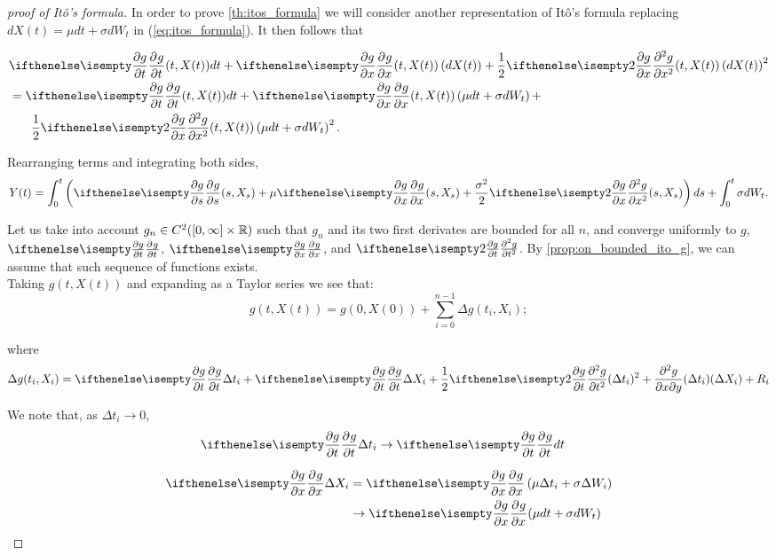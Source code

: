 \documentclass[../TGMAFFIRO.tex]{subfiles}
\begin{document}
\begin{proof}[proof of It\^o's formula]
	In order to prove \ref{th:itos_formula} we will consider another representation of It\^o's formula replacing $dX(t) = \mu dt + \sigma dW_t$ in (\ref{eq:itos_formula}). It then follows that
	
	\begin{align*}
		&\partialwrt{g}{t}(t, X(t)) dt + \partialwrt{g}{x}(t, X(t)) \left(dX(t)\right) + \frac{1}{2}\partialwrt[2]{g}{x} (t, X(t)) \left(dX(t)\right)^2 \\
		&= \partialwrt{g}{t}(t, X(t)) dt + \partialwrt{g}{x}(t, X(t)) \left(\mu dt + \sigma dW_t\right) + \\
		&\phantom{{}=1} \frac{1}{2}\partialwrt[2]{g}{x} (t, X(t)) \left(\mu dt + \sigma dW_t\right)^2.
	\end{align*}
	
	Rearranging terms and integrating both sides, 
	\begin{equation}
  Y(t) = \int_0^t \left(\partialwrt{g}{s}{(s, X_s)} + \mu\partialwrt{g}{x}{(s, X_s)} + \frac{\sigma^2}{2}\partialwrt[2]{g}{x}{(s, X_s)}\right)ds + \int_0^t \sigma dW_t.
	\end{equation}

	Let us take into account $g_n \in C^2([0, \infty]\times\mathbb{R})$ such that $g_n$ and its two first derivates are bounded for all $n$, and converge uniformly to $g$, $\partialwrt{g}{t}$, $\partialwrt{g}{x}$, and $\partialwrt[2]{g}{t}$. By \ref{prop:on_bounded_ito_g}, we can assume that such sequence of functions exists.\\
	
	Taking $g(t, X(t))$ and expanding as a Taylor series we see that:
	\begin{equation}\label{eq:taylor_g}
		g(t, X(t)) = g(0, X(0)) + \sum_{i=0}^{n-1}\Delta g(t_i, X_i);
	\end{equation}
	
	where 
	\[
		\Delta g(t_i, X_i) = \partialwrt{g}{t}\Delta t_i + \partialwrt{g}{t} \Delta X_i + \frac{1}{2}\partialwrt[2]{g}{t} (\Delta t_i)^2 + \frac{\partial^2 g}{\partial x \partial y}(\Delta t_i)(\Delta X_i) + R_i
	\]
	
	We note that, as $\Delta t_i \to 0$,
\begin{align} 
\partialwrt{g}{t} \Delta t_i &\to \partialwrt{g}{t} dt
\end{align}

\begin{align} 
\partialwrt{g}{x} \Delta X_i &= \partialwrt{g}{x}\left(\mu\Delta t_i + \sigma \Delta W_i \right) \nonumber \\
&\to  \partialwrt{g}{x}(\mu dt + \sigma dW_t)
\end{align}


\end{proof}
\end{document}
